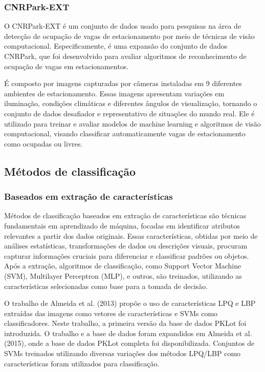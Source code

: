 \subsubsection{CNRPark-EXT}

O CNRPark-EXT \cite{cnrpark} é um conjunto de dados usado para pesquisas na área de detecção de ocupação de vagas de estacionamento por meio de técnicas de visão computacional. Especificamente, é uma expansão do conjunto de dados CNRPark, que foi desenvolvido para avaliar algoritmos de reconhecimento de ocupação de vagas em estacionamentos.

É composto por imagens capturadas por câmeras instaladas em 9 diferentes ambientes de estacionamento. Essas imagens apresentam variações em iluminação, condições climáticas e diferentes ângulos de visualização, tornando o conjunto de dados desafiador e representativo de situações do mundo real. Ele é utilizado para treinar e avaliar modelos de machine learning e algoritmos de visão computacional, visando classificar automaticamente vagas de estacionamento como ocupadas ou livres. 

\subsection{Métodos de classificação}
\subsubsection{Baseados em extração de características}

Métodos de classificação baseados em extração de características são técnicas fundamentais em aprendizado de máquina, focadas em identificar atributos relevantes a partir dos dados originais. Essas características, obtidas por meio de análises estatísticas, transformações de dados ou descrições visuais, procuram capturar informações cruciais para diferenciar e classificar padrões ou objetos. Após a extração, algoritmos de classificação, como Support Vector Machine (SVM), Multilayer Perceptron (MLP), e outros, são treinados, utilizando as características selecionadas como base para a tomada de decisão.

O trabalho de Almeida et al. (2013) propõe o uso de características LPQ e LBP extraídas das imagens como vetores de características e SVMs como classificadores. Neste trabalho, a primeira versão da base de dados PKLot foi introduzida. O trabalho e a base de dados foram expandidos em Almeida et al. (2015), onde a base de dados PKLot completa foi disponibilizada. Conjuntos de SVMs treinados utilizando diversas variações dos métodos LPQ/LBP como características foram utilizados para classificação.

